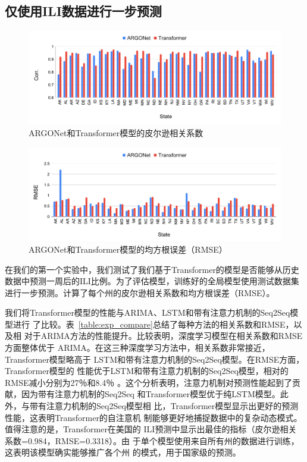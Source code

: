 \subsection{仅使用ILI数据进行一步预测}
\begin{figure}
\includegraphics[width=\textwidth]{argo_transformer_corr.pdf}
\caption{ARGONet和Transformer模型的皮尔逊相关系数}
\label{fig:argo_transformer_corr}
\end{figure}
\begin{figure}
    \includegraphics[width=\textwidth]{argo_transformer_rmse.pdf}
    \caption{ARGONet和Transformer模型的均方根误差（RMSE）}
    \label{fig:argo_transformer_rmse}
    \end{figure}
    
    在我们的第一个实验中，我们测试了我们基于Transformer的模型是否能够从历史数据中预测一周后的ILI比例。为了评估模型，训练好的全局模型使用测试数据集进行一步预测。计算了每个州的皮尔逊相关系数和均方根误差（RMSE）。
    
    我们将Transformer模型的性能与ARIMA、LSTM和带有注意力机制的Seq2Seq模型进行
    了比较。表~\ref{table:exp_compare}总结了每种方法的相关系数和RMSE，以及相
    对于ARIMA方法的性能提升。比较表明，深度学习模型在相关系数和RMSE方面整体优于
    ARIMA。在这三种深度学习方法中，相关系数非常接近，Transformer模型略高于
    LSTM和带有注意力机制的Seq2Seq模型。在RMSE方面，Transformer模型的
    性能优于LSTM和带有注意力机制的Seq2Seq模型，相对的RMSE减小分别为27％和8.4％
    。这个分析表明，注意力机制对预测性能起到了贡献，因为带有注意力机制的Seq2Seq
    和Transformer模型优于纯LSTM模型。此外，与带有注意力机制的Seq2Seq模型相
    比，Transformer模型显示出更好的预测性能，这表明Transformer的自注意机
    制能够更好地捕捉数据中的复杂动态模式。值得注意的是，Transformer在美国的
    ILI预测中显示出最佳的指标（皮尔逊相关系数=0.984，RMSE=0.3318）。由
    于单个模型使用来自所有州的数据进行训练，这表明该模型确实能够推广各个州
    的模式，用于国家级的预测。
    
